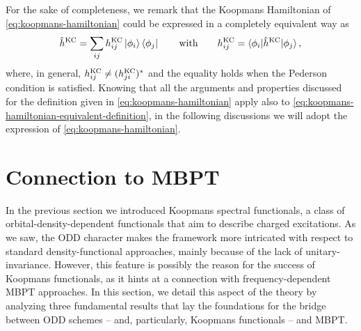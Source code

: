 For the sake of completeness, we remark that the Koopmans Hamiltonian of \cref{eq:koopmans-hamiltonian} could be expressed in a completely equivalent way as
%
\begin{equation}
    \hat{h}^{\rm KC} = \sum_{ij} h^{\rm KC}_{ij} \ket{\phi_i} \bra{\phi_j}
    \qquad \text{with} \qquad
    h^{\rm KC}_{ij} = \braket{\phi_i | \hat{h}^{\rm KC} | \phi_j} ,
    \label{eq:koopmans-hamiltonian-equivalent-definition}
\end{equation}
%
where, in general, $h^{\rm KC}_{ij} \neq (h^{\rm KC}_{ji})^*$ and the equality holds when the Pederson condition is satisfied. Knowing that all the arguments and properties discussed for the definition given in \eqref{eq:koopmans-hamiltonian} apply also to \cref{eq:koopmans-hamiltonian-equivalent-definition}, in the following discussions we will adopt the expression of \cref{eq:koopmans-hamiltonian}.

\section{Connection to MBPT\label{sec:koopmans-vs-mbpt}}
In the previous section we introduced Koopmans spectral functionals, a class of orbital-density-dependent functionals that aim to describe charged excitations. As we saw, the ODD character makes the framework more intricated with respect to standard density-functional approaches, mainly because of the lack of unitary-invariance. However, this feature is possibly the reason for the success of Koopmans functionals, as it hints at a connection with frequency-dependent MBPT approaches. In this section, we detail this aspect of the theory by analyzing three fundamental results that lay the foundations for the bridge between ODD schemes -- and, particularly, Koopmans functionals -- and MBPT.

